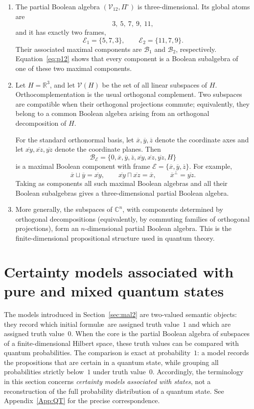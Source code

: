 \documentclass{article}   	%
\theoremstyle{plain}
\theoremstyle{definition}
\theoremstyle{remark}
\begin{document}
\begin{enumerate}
\item
The partial Boolean algebra $(\mathcal V_{12},\Pi^\circ)$ is
three-dimensional.  Its global atoms are
\[
3,\ 5,\ 7,\ 9,\ 11,
\]
and it has exactly two frames,
\[
\mathcal E_1=\{5,7,3\},
\qquad
\mathcal E_2=\{11,7,9\}.
\]
Their associated maximal components are $\mathcal B_1$ and
$\mathcal B_2$, respectively.  Equation~\eqref{eq:p12} shows that every
component is a Boolean subalgebra of one of these two maximal components.

\item
Let $H=\mathbb R^3$, and let $\mathcal V(H)$ be the set of all linear
subspaces of $H$.  Orthocomplementation is the usual orthogonal complement.
Two subspaces are compatible when their orthogonal projections commute;
equivalently, they belong to a common Boolean algebra arising from an
orthogonal decomposition of $H$.

For the standard orthonormal basis, let
$\overline x,\overline y,\overline z$ denote the coordinate axes and let
$\overline{xy},\overline{xz},\overline{yz}$ denote the coordinate planes.
Then
\[
\mathcal B_{\mathcal E}
=
\{0,\overline x,\overline y,\overline z,
  \overline{xy},\overline{xz},\overline{yz},H\}
\]
is a maximal Boolean component with frame
$\mathcal E=\{\overline x,\overline y,\overline z\}$.  For example,
\[
\overline x\sqcup\overline y=\overline{xy},\qquad
\overline{xy}\sqcap\overline{xz}=\overline x,
\qquad
\overline x^\perp=\overline{yz}.
\]
Taking as components all such maximal Boolean algebras and all their Boolean
subalgebras gives a three-dimensional partial Boolean algebra.

\item
More generally, the subspaces of $\mathbb C^n$, with components determined
by orthogonal decompositions (equivalently, by commuting families of
orthogonal projections), form an $n$-dimensional partial Boolean algebra.
This is the finite-dimensional propositional structure used in quantum
theory.
\end{enumerate}

\section{Certainty models associated with pure and mixed quantum states}
\label{pm}

The models introduced in Section~\ref{sec:mal2} are two-valued semantic objects:
they record which initial formul\ae\ are assigned truth value~$1$ and which are
assigned truth value~$0$.
When the core is the partial Boolean algebra of subspaces of a finite-dimensional
Hilbert space, these truth values can be compared with quantum probabilities.
The comparison is exact at probability~$1$: a model records the propositions that
are certain in a quantum state, while grouping all probabilities strictly below~$1$
under truth value~$0$.
Accordingly, the terminology in this section concerns \emph{certainty models
associated with states}, not a reconstruction of the full probability distribution
of a quantum state.
See Appendix~\ref{App:QT} for the precise correspondence.
\end{document}
